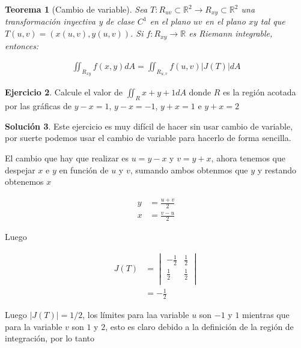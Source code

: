 \documentclass{article}
\theoremstyle{plain}
\newtheorem{thm}{Teorema}[section]
\theoremstyle{definition}
\newtheorem{ejer}[thm]{Ejercicio}
\newtheorem{sol}[thm]{Solución}
\begin{document}
\begin{thm}[Cambio de variable]Sea $T : R_{uv} \subset \mathbb{R}^2 \to R_{xy}\subset \mathbb{R}^2$ una transformaci\'on inyectiva y de clase $C^1$ en el plano $uv$ en el plano $xy$ tal que $T (u, v ) = (x (u, v ) , y (u, v ))$. Si $f : R_{xy} \to \mathbb{R}$ es Riemann integrable, entonces:
\end{thm}

\begin{align*}
    \iint_{R_{xy}} f(x,y)dA =  \iint_{R_{u,v}} f(u,v) |J(T)|dA
\end{align*}

\newpage

\begin{ejer}Calcule el valor de $\iint_{R} x+y+1dA$ donde $R$ es la regi\'on acotada por las gr\'aficas de $y-x=1$, $y-x=-1$, $y+x=1$ e $y+x=2$ \\
\end{ejer}

\begin{sol}Este ejercicio es muy dif\'icil de hacer sin usar cambio de variable, por suerte podemos usar el cambio de variable para hacerlo de forma sencilla. \\
\end{sol}

El cambio que hay que realizar es $u=y-x$ y $v=y+x$, ahora tenemos que despejar $x$ e $y$ en funci\'on de $u$ y $v$, sumando ambos obtenmos que $y$ y restando obtenemos $x$

\begin{align*}
    y &= \frac{u+v}{2} \\
    x &= \frac{v-u}{2}
\end{align*}

Luego


\begin{align*}
    J(T) &=\begin{vmatrix}
        -\frac{1}{2} & \frac{1}{2} \\
        \frac{1}{2} & \frac{1}{2} \\
    \end{vmatrix} \\
    &= -\frac{1}{2}
\end{align*}

Luego $|J(T)| =1/2$, los l\'imites para laa variable $u$ son $-1$ y $1$ mientras que para la variable $v$ son $1$ y $2$, esto es claro debido a la definici\'on de la regi\'on de integraci\'on, por lo tanto
\end{document}

